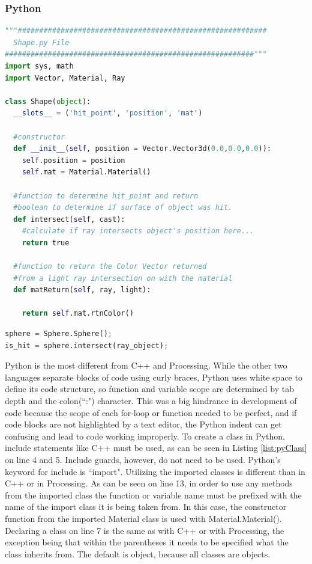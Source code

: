 \subsubsection{Python}
\singlespacing
\begin{lstlisting}[language=Python, caption = Example of class definition in Python, style=mystyle, label=list:pyClass]
"""##########################################################
  Shape.py File
##########################################################"""
import sys, math
import Vector, Material, Ray

class Shape(object):
  __slots__ = ('hit_point', 'position', 'mat')

  #constructor
  def __init__(self, position = Vector.Vector3d(0.0,0.0,0.0)):
    self.position = position
    self.mat = Material.Material()

  #function to determine hit_point and return
  #boolean to determine if surface of object was hit.
  def intersect(self, cast):
    #calculate if ray intersects object's position here...
    return true

  #function to return the Color Vector returned
  #from a light ray intersection on with the material
  def matReturn(self, ray, light):

    return self.mat.rtnColor()

\end{lstlisting}
\begin{lstlisting}[language=Python, caption=Python Usasge Example, style=mystyle,label=list:pyUse]
sphere = Sphere.Sphere();
is_hit = sphere.intersect(ray_object);
\end{lstlisting}
\doublespacing

Python is the most different from C++ and Processing.  While the other two languages separate blocks of code using curly braces, Python uses white space to define its code structure, so function and variable scope are determined by tab depth and the colon(``:") character.  This was a big hindrance in development of code because the scope of each for-loop or function needed to be perfect, and if code blocks are not highlighted by a text editor, the Python indent can get confusing and lead to code working improperly.  To create a class in Python, include statements like C++ must be used, as can be seen in Listing \ref{list:pyClass} on line 4 and 5.  Include guards, however, do not need to be used.  Python's keyword for include is ``import".  Utilizing the imported classes is different than in C++ or in Processing.  As can be seen on line 13, in order to use any methods from the imported class the function or variable name must be prefixed with the name of the import class it is being taken from. In this case, the constructor function from the imported Material class is used with Material.Material().  Declaring a class on line 7 is the same as with C++ or with Processing, the exception being that within the parentheses it needs to be specified what the class inherits from.  The default is object, because all classes are objects.

